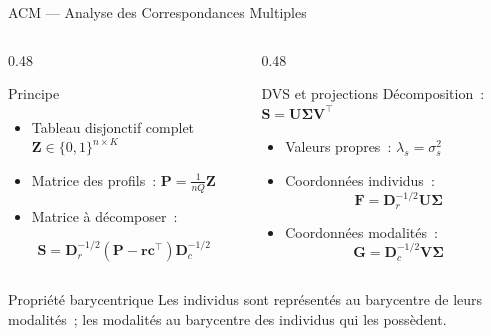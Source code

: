 \documentclass[aspectratio=169, 10pt]{beamer}
\begin{document}
\begin{frame}{ACM — Analyse des Correspondances Multiples}
    \begin{columns}[T]
        \begin{column}{0.48\textwidth}
            \begin{block}{Principe}
                \begin{itemize}
                    \item Tableau disjonctif complet
                          $\mathbf{Z} \in \{0,1\}^{n \times K}$
                    \item Matrice des profils~:
                          $\mathbf{P} = \tfrac{1}{nQ}\mathbf{Z}$
                    \item Matrice à décomposer~:
                \end{itemize}
                \vspace{4pt}
                \[
                    \mathbf{S} = \mathbf{D}_r^{-1/2}
                    \!\left(\mathbf{P} - \mathbf{r}\mathbf{c}^{\top}\right)
                    \!\mathbf{D}_c^{-1/2}
                \]
            \end{block}
        \end{column}
        \begin{column}{0.48\textwidth}
            \begin{block}{DVS et projections}
                Décomposition~: $\mathbf{S} = \mathbf{U}\boldsymbol{\Sigma}\mathbf{V}^{\top}$
                \vspace{4pt}
                \begin{itemize}
                    \item Valeurs propres~:
                          $\lambda_s = \sigma_s^2$
                    \item Coordonnées individus~:
                          \[
                              \mathbf{F} =
                              \mathbf{D}_r^{-1/2}\mathbf{U}\boldsymbol{\Sigma}
                          \]
                    \item Coordonnées modalités~:
                          \[
                              \mathbf{G} =
                              \mathbf{D}_c^{-1/2}\mathbf{V}\boldsymbol{\Sigma}
                          \]
                \end{itemize}
            \end{block}
        \end{column}
    \end{columns}
    \vspace{6pt}
    \begin{exampleblock}{Propriété barycentrique}
        Les individus sont représentés au barycentre de leurs modalités~;
        les modalités au barycentre des individus qui les possèdent.
    \end{exampleblock}
\end{frame}
\end{document}
